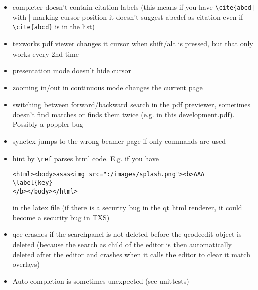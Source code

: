 \documentclass[10pt,a4paper,portrait]{article}
\begin{document}
\begin{itemize}
\item completer doesn't contain citation labels (this means if you have \verb+\cite{abcd|+ with | marking cursor position it doesn't suggest abcdef as citation even if \verb+\cite{abcd}+ is in the list)
\item texworks pdf viewer changes it cursor when shift/alt is pressed, but that only works every 2nd time
\item presentation mode doesn't hide cursor
\item zooming in/out in continuous mode changes the current page
\item switching between forward/backward search in the pdf previewer, sometimes doesn't find matches or finds them twice (e.g. in this development.pdf). Possibly a poppler bug
\item synctex jumps to the wrong beamer page if only-commands are used
\item hint by \verb+\ref+ parses html code. E.g. if you have \begin{verbatim}
<html><body>asas<img src=":/images/splash.png"><b>AAA
\label{key}
</b></body></html>
\end{verbatim} in the latex file (if there is a security bug in the qt html renderer, it could become a security bug in TXS)
	\item  qce crashes if the searchpanel is not deleted before the qcodeedit object is deleted (because the search as child of the editor is then automatically deleted after the editor and crashes when it calls the editor to clear it match overlays)
	\item  Auto completion is sometimes unexpected (see unittests)
\end{itemize} 
\end{document}
